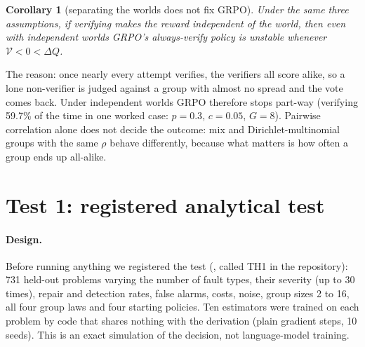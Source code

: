 \documentclass[11pt]{article}
\newtheorem{corollary}{Corollary}
\begin{document}
\begin{corollary}[separating the worlds does not fix GRPO]\label{cor:homog}
Under the same three assumptions, if verifying makes the reward independent of the world, then even with independent
worlds GRPO's always-verify policy is unstable whenever $\mathcal V<0<\Delta Q$.
\end{corollary}
\noindent The reason: once nearly every attempt verifies, the verifiers all score alike, so a lone non-verifier is
judged against a group with almost no spread and the vote comes back. Under independent worlds GRPO therefore stops
part-way (verifying 59.7\% of the time in one worked case: $p=0.3$, $c=0.05$, $G=8$). Pairwise correlation alone does
not decide the outcome: mix and Dirichlet-multinomial groups with the same $\rho$ behave differently, because what
matters is how often a group ends up all-alike.

\section{Test 1: registered analytical test}\label{sec:th1}
\paragraph{Design.} Before running anything we registered the test (, called TH1 in the
repository): 731 held-out problems varying the number of fault types, their severity (up to 30 times), repair and
detection rates, false alarms, costs, noise, group sizes 2 to 16, all four group laws and four starting policies. Ten
estimators were trained on each problem by code that shares nothing with the derivation (plain gradient steps, 10
seeds). This is an exact simulation of the decision, not language-model training.

\begin{table}[t]\centering\small
{}
\caption{The seven registered hypotheses of Test~1 (H1 to H7 in the registration, in this order).
Source: .}\label{tab:th1h}
\end{table}
\end{document}
